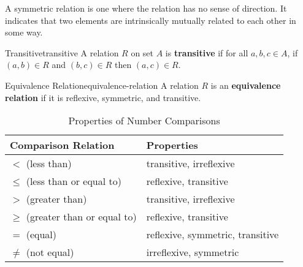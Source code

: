 A symmetric relation is one where the relation has no sense of direction. It indicates that two elements are
intrinsically mutually related to each other in some way.

\begin{definition}{Transitive}{transitive}
  A relation \( R \) on set \( A \) is \textbf{transitive} if for all \( a, b, c \in A \), if \( (a, b) \in R \) and
  \( (b, c) \in R \) then \( (a, c) \in R \).
\end{definition}



\begin{definition}{Equivalence Relation}{equivalence-relation}
  A relation \( R \) is an \textbf{equivalence relation} if it is reflexive, symmetric, and transitive.
\end{definition}

\begin{table}[H]
  \centering
  \begin{tabular}{p{2in} p{3in}}
  \toprule
  \textbf{Comparison Relation} & \textbf{Properties} \\
  \midrule
  \( < \) (less than) & transitive, irreflexive \\
  \( \leq \) (less than or equal to) & reflexive, transitive \\
  \( > \) (greater than) & transitive, irreflexive \\
  \( \geq \) (greater than or equal to) & reflexive, transitive \\
  \( = \) (equal) & reflexive, symmetric, transitive \\
  \( \neq \) (not equal) & irreflexive, symmetric \\
  \bottomrule
  \end{tabular}
  \caption{Properties of Number Comparisons}
\end{table}

